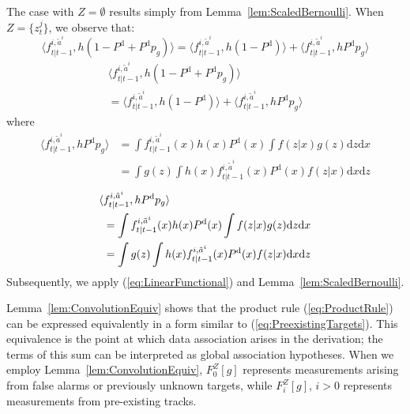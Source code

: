 \documentclass[journal,twoside]{IEEEtran}
\theoremstyle{plain}
\begin{document}
\begin{IEEEproof}
The case with $Z=\emptyset$ results simply from Lemma~\ref{lem:ScaledBernoulli}. When $Z=\{z_t^j\}$, we observe that:
%
\ifCLASSOPTIONdraftcls
\begin{equation}
\langle  f_{t|t-1}^{i,\tilde{a}^i},h(1-P^{\mathrm{d}} + P^{\mathrm{d}} p_g)\rangle 
= \langle f_{t|t-1}^{i,\tilde{a}^i},h(1-P^{\mathrm{d}})\rangle + 
\langle f_{t|t-1}^{i,\tilde{a}^i},hP^{\mathrm{d}} p_g\rangle
\end{equation}
\else
\begin{multline}
\langle  f_{t|t-1}^{i,\tilde{a}^i},h(1-P^{\mathrm{d}} + P^{\mathrm{d}} p_g)\rangle \\
= \langle f_{t|t-1}^{i,\tilde{a}^i},h(1-P^{\mathrm{d}})\rangle + 
\langle f_{t|t-1}^{i,\tilde{a}^i},hP^{\mathrm{d}} p_g\rangle
\end{multline}
\fi
%
where
\ifCLASSOPTIONdraftcls
\begin{align}
\langle f_{t|t-1}^{i,\tilde{a}^i},hP^{\mathrm{d}} p_g\rangle 
&= \int f_{t|t-1}^{i,\tilde{a}^i}(x)h(x)P^{\mathrm{d}}(x)\int f(z|x)g(z)\mathrm{d} z\mathrm{d} x \\
&= \int g(z)\int h(x)f_{t|t-1}^{i,\tilde{a}^i}(x)P^{\mathrm{d}}(x)f(z|x)\mathrm{d} x\mathrm{d} z
\end{align}
\else
\begin{align}
\langle & f_{t|t-1}^{i,\tilde{a}^i},hP^{\mathrm{d}} p_g\rangle \notag\\
&= \int f_{t|t-1}^{i,\tilde{a}^i}(x)h(x)P^{\mathrm{d}}(x)\int f(z|x)g(z)\mathrm{d} z\mathrm{d} x \\
&= \int g(z)\int h(x)f_{t|t-1}^{i,\tilde{a}^i}(x)P^{\mathrm{d}}(x)f(z|x)\mathrm{d} x\mathrm{d} z
\end{align}
\fi
%
Subsequently, we apply (\ref{eq:LinearFunctional}) and Lemma~\ref{lem:ScaledBernoulli}.
\end{IEEEproof}

Lemma~\ref{lem:ConvolutionEquiv} shows that the product rule (\ref{eq:ProductRule}) can be expressed equivalently in a form similar to (\ref{eq:PreexistingTargets}). This equivalence is the point at which data association arises in the derivation; the terms of this sum can be interpreted as global association hypotheses. When we employ Lemma~\ref{lem:ConvolutionEquiv}, $F_0^Z[g]$ represents measurements arising from false alarms or previously unknown targets, while $F_i^Z[g]$, $i>0$ represents measurements from pre-existing tracks.
\end{document}
